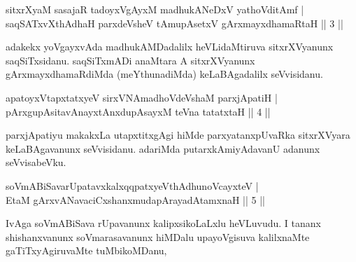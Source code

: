 
\begin{shl}
sitxrXyaM sasajaR tadoyxVgAyxM \footnotemark[1]madhukANeDxV yathoVditAmf | \\
saqSATxvX\s thAdhaH parxdeVsheV tAmupAsetxV \footnotemark[2]gArxmayxdhamaRtaH \hfill|| 3 || 
\end{shl}

\begin{artha}
adakekx yoVgayxvAda madhukAMDadalilx heVLidaMtiruva sitxrXVyanunx 
saqSiTxsidanu. saqSiTxmADi anaMtara A sitxrXVyanunx 
gArxmayxdhamaRdiMda (meYthunadiMda) keLaBAgadalilx seVvisidanu.
\end{artha}


\begin{shl}
apatoyxVtapxtatxyeV sirxVNAmadhoVdeVshaM parxjApatiH | \\
pArxgupAsitavAnayxtAnxdupAsayxM teVna tatatxtaH \hfill|| 4 || 
\end{shl}

\begin{artha}
parxjApatiyu makakxLa utapxtitxgAgi hiMde parxyatanxpUvaRka 
sitxrXVyara keLaBAgavanunx seVvisidanu. adariMda putarxkAmiyAdavanU 
adanunx seVvisabeVku.
\end{artha}


\begin{shl}
\footnotemark[1]soVmABiSavarUpatavxkalxqqpatxyeV\s thAdhunoVcayxteV | \\
EtaM gArxvANavaciCxshanxmudapArayadAtamxnaH \hfill|| 5 || 
\end{shl}

\begin{artha}
IvAga soVmABiSava rUpavanunx kalipxsikoLaLxlu heVLuvudu. I tananx 
shishanxvanunx soVmarasavanunx hiMDalu upayoVgisuva kalilxnaMte 
gaTiTxyAgiruvaMte tuMbikoMDanu,
\end{artha}

